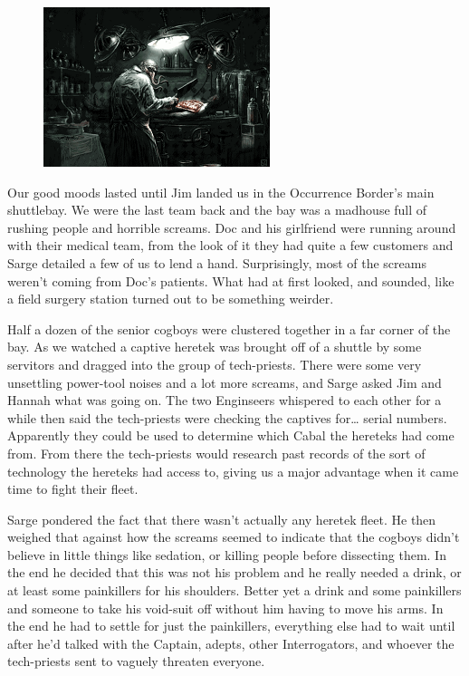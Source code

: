 \begin{figure}
	\begin{center}
		\includegraphics[width=\figwidth]{pics/11/64.png}
	\end{center}
\end{figure}
Our good moods lasted until Jim landed us in the Occurrence Border's main shuttlebay. 
We were the last team back and the bay was a madhouse full of rushing people and horrible screams. 
Doc and his girlfriend were running around with their medical team, from the look of it they had quite a few customers and Sarge detailed a few of us to lend a hand. 
Surprisingly, most of the screams weren't coming from Doc's patients. 
What had at first looked, and sounded, like a field surgery station turned out to be something weirder.

Half a dozen of the senior cogboys were clustered together in a far corner of the bay. 
As we watched a captive heretek was brought off of a shuttle by some servitors and dragged into the group of tech-priests. 
There were some very unsettling power-tool noises and a lot more screams, and Sarge asked Jim and Hannah what was going on. 
The two Enginseers whispered to each other for a while then said the tech-priests were checking the captives for… serial numbers. 
Apparently they could be used to determine which Cabal the hereteks had come from. 
From there the tech-priests would research past records of the sort of technology the hereteks had access to, giving us a major advantage when it came time to fight their fleet. 


Sarge pondered the fact that there wasn't actually any heretek fleet. 
He then weighed that against how the screams seemed to indicate that the cogboys didn't believe in little things like sedation, or killing people before dissecting them. 
In the end he decided that this was not his problem and he really needed a drink, or at least some painkillers for his shoulders. 
Better yet a drink and some painkillers and someone to take his void-suit off without him having to move his arms. 
In the end he had to settle for just the painkillers, everything else had to wait until after he'd talked with the Captain, adepts, other Interrogators, and whoever the tech-priests sent to vaguely threaten everyone.


